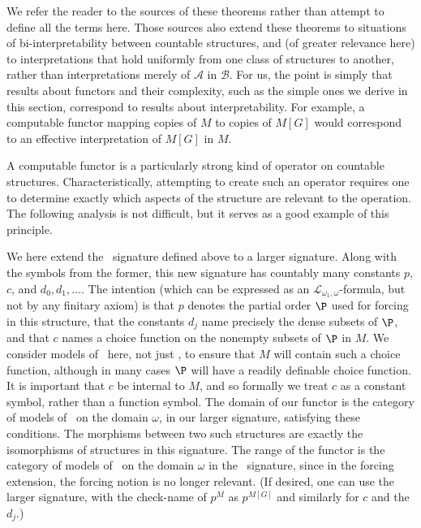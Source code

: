 \documentclass{amsart}
\begin{document}
We refer the reader to the sources of these theorems rather than attempt
to define all the terms here.  Those sources also extend these theorems
to situations of bi-interpretability between countable structures, and (of greater relevance here)
to interpretations that hold uniformly from one class of structures to another,
rather than interpretations merely of $\mathcal A$ in $\mathcal B$.  For us, the point is simply
that results about functors and their complexity, such as the simple ones
we derive in this section, correspond to results about interpretability.
For example, a computable functor mapping copies of $M$ to copies
of $M[G]$ would correspond to an effective interpretation of $M[G]$ in $M$.

A computable functor is a particularly strong kind of operator on countable structures.
Characteristically, attempting to create such an operator requires one to determine
exactly which aspects of the structure are relevant to the operation.
The following analysis is not difficult, but it serves as a good example of this principle.

We here extend the \Levy\ signature defined above to a larger signature.
Along with the symbols from the former, this new signature has countably many
constants $p$, $c$, and $d_0,d_1,\ldots$.  The intention (which can be expressed
as an $\mathcal{L}_{\omega_1,\omega}$-formula, but not by any finitary axiom) is that
$p$ denotes the partial order $\P$ used for forcing in this structure,
that the constants $d_j$ name precisely the dense subsets of $\P$,
and that $c$ names a choice function on the nonempty subsets of $\P$ in $M$.
We consider models of \ZFC\ here, not just \ZF, to ensure that $M$ will
contain such a choice function, although in many cases $\P$ will
have a readily definable choice function.  It is important
that $c$ be internal to $M$, and so formally we treat $c$ as a constant symbol,
rather than a function symbol.
The domain of our functor is the category of models of \ZFC\ on the domain $\omega$,
in our larger signature, satisfying these conditions.
The morphisms between two such structures are exactly the isomorphisms of structures
in this signature.  The range of the functor is the category of models of \ZFC\ on the
domain $\omega$ in the \Levy\ signature, since in the forcing extension,
the forcing notion is no longer relevant.  (If desired, one can use the larger signature, with the check-name of $p^M$ as $p^{M[G]}$ and similarly for $c$ and the $d_j$.)
\end{document}

